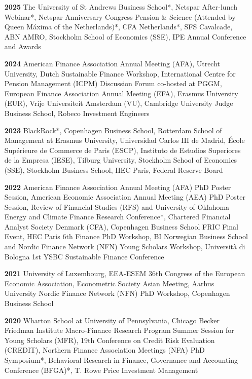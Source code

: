 \documentclass[11pt]{res} %
\begin{document}
\begin{resume}
\begin{itemize}
\item[\textbf{2025}] The University of St Andrews Business School*, Netspar After-lunch Webinar*, Netspar Anniversary Congress Pension \& Science (Attended by Queen Máxima of the Netherlands)*, CFA Netherlands*, SFS Cavalcade, ABN AMRO, Stockholm School of Economics (SSE), IPE Annual Conference and Awards\\[-1ex] 

\item[\textbf{2024}] American Finance Association Annual Meeting (AFA), Utrecht University, Dutch Sustainable Finance Workshop, International Centre for Pension Management (ICPM)  Discussion Forum co-hosted at PGGM, European Finance Association Annual Meeting (EFA), Erasmus University (EUR), Vrije Universiteit Amsterdam (VU), Cambridge University Judge Business School, Robeco Investment Engineers\\[-1ex] %

\item[\textbf{2023}] BlackRock*, Copenhagen Business School, Rotterdam School of Management at Erasmus University, Universidad Carlos III de Madrid, École Supérieure de Commerce de Paris (ESCP), Instituto de Estudios Superiores de la Empresa (IESE), Tilburg University, Stockholm School of Economics (SSE), Stockholm Business School, HEC Paris, Federal Reserve Board\\[-1ex]

\item[\textbf{2022}]  American Finance Association Annual Meeting (AFA) PhD Poster Session, American Economic Association Annual Meeting (AEA) PhD Poster Session, Review of Financial Studies (RFS) and University of Oklahoma Energy and Climate Finance Research Conference*, Chartered Financial Analyst Society Denmark (CFA), Copenhagen Business School FRIC Final Event, HEC Paris 6th Finance PhD Workshop,  BI Norwegian Business School and Nordic Finance Network (NFN) Young Scholars Workshop, Università di Bologna 1st YSBC Sustainable Finance Conference\\[-1ex]

\item[\textbf{2021}]  University of Luxembourg, EEA-ESEM 36th Congress of the European Economic Association, Econometric Society Asian Meeting,  Aarhus University Nordic Finance Network (NFN) PhD Workshop, Copenhagen Business School\\[-1ex]

\item[\textbf{2020}]  Wharton School at University of Pennsylvania, Chicago Becker Friedman Institute Macro-Finance Research Program Summer Session for Young Scholars (MFR), 19th Conference on Credit Risk Evaluation (CREDIT), Northern Finance Association Meetings (NFA) PhD Symposium*, Behavioral Research in Finance, Governance and Accounting Conference (BFGA)*, T. Rowe Price Investment Management\\[-1ex]


\end{itemize}
\end{resume}
\end{document}

